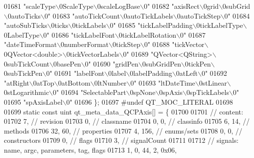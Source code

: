 \begin{DoxyCode}
01681     \textcolor{stringliteral}{"scaleType\(\backslash\)0ScaleType\(\backslash\)0scaleLogBase\(\backslash\)0"}
01682     \textcolor{stringliteral}{"axisRect\(\backslash\)0grid\(\backslash\)0subGrid\(\backslash\)0autoTicks\(\backslash\)0"}
01683     \textcolor{stringliteral}{"autoTickCount\(\backslash\)0autoTickLabels\(\backslash\)0autoTickStep\(\backslash\)0"}
01684     \textcolor{stringliteral}{"autoSubTicks\(\backslash\)0ticks\(\backslash\)0tickLabels\(\backslash\)0"}
01685     \textcolor{stringliteral}{"tickLabelPadding\(\backslash\)0tickLabelType\(\backslash\)0LabelType\(\backslash\)0"}
01686     \textcolor{stringliteral}{"tickLabelFont\(\backslash\)0tickLabelRotation\(\backslash\)0"}
01687     \textcolor{stringliteral}{"dateTimeFormat\(\backslash\)0numberFormat\(\backslash\)0tickStep\(\backslash\)0"}
01688     \textcolor{stringliteral}{"tickVector\(\backslash\)0QVector<double>\(\backslash\)0tickVectorLabels\(\backslash\)0"}
01689     \textcolor{stringliteral}{"QVector<QString>\(\backslash\)0subTickCount\(\backslash\)0basePen\(\backslash\)0"}
01690     \textcolor{stringliteral}{"gridPen\(\backslash\)0subGridPen\(\backslash\)0tickPen\(\backslash\)0subTickPen\(\backslash\)0"}
01691     \textcolor{stringliteral}{"labelFont\(\backslash\)0label\(\backslash\)0labelPadding\(\backslash\)0atLeft\(\backslash\)0"}
01692     \textcolor{stringliteral}{"atRight\(\backslash\)0atTop\(\backslash\)0atBottom\(\backslash\)0ltNumber\(\backslash\)0"}
01693     \textcolor{stringliteral}{"ltDateTime\(\backslash\)0stLinear\(\backslash\)0stLogarithmic\(\backslash\)0"}
01694     \textcolor{stringliteral}{"SelectablePart\(\backslash\)0spNone\(\backslash\)0spAxis\(\backslash\)0spTickLabels\(\backslash\)0"}
01695     \textcolor{stringliteral}{"spAxisLabel\(\backslash\)0"}
01696 \};
01697 \textcolor{preprocessor}{#undef QT\_MOC\_LITERAL}
01698 
01699 \textcolor{keyword}{static} \textcolor{keyword}{const} uint qt\_meta\_data\_QCPAxis[] = \{
01700 
01701  \textcolor{comment}{// content:}
01702        7,       \textcolor{comment}{// revision}
01703        0,       \textcolor{comment}{// classname}
01704        0,    0, \textcolor{comment}{// classinfo}
01705        6,   14, \textcolor{comment}{// methods}
01706       32,   60, \textcolor{comment}{// properties}
01707        4,  156, \textcolor{comment}{// enums/sets}
01708        0,    0, \textcolor{comment}{// constructors}
01709        0,       \textcolor{comment}{// flags}
01710        3,       \textcolor{comment}{// signalCount}
01711 
01712  \textcolor{comment}{// signals: name, argc, parameters, tag, flags}
01713        1,    0,   44,    2, 0x06,

\end{DoxyCode}
